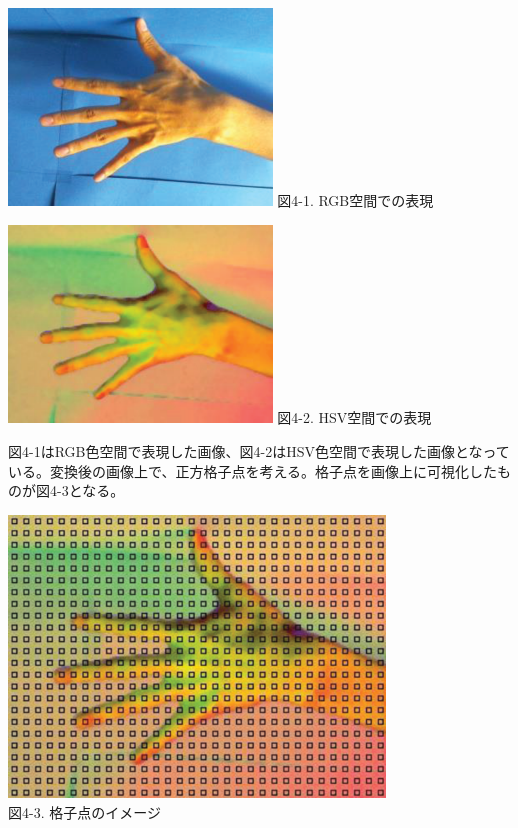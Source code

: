  \vspace{5mm}
\begin{minipage}{0.5\hsize}
  \begin{center}
   \includegraphics[width=70mm]{Simulator_getPic.eps}
   図4-1. RGB空間での表現
  \end{center}
  \label{fig:one}
 \end{minipage}
 \begin{minipage}{0.5\hsize}
  \begin{center}
   \includegraphics[width=70mm]{Simulator_hsv.eps}
   図4-2. HSV空間での表現
  \end{center}
  \label{fig:two}
 \end{minipage}
 
図4-1はRGB色空間で表現した画像、図4-2はHSV色空間で表現した画像となっている。変換後の画像上で、正方格子点を考える。格子点を画像上に可視化したものが図4-3となる。

\begin{center}
  \includegraphics[width=10cm]{Simulator_grid.eps} \\
 \vspace{1mm}
  図4-3. 格子点のイメージ
\end{center}


